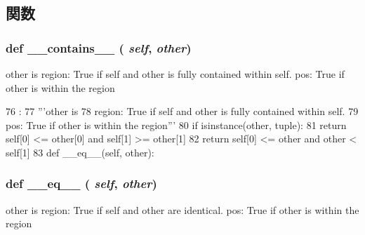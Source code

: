 \subsection{関数}
\hypertarget{classm5_1_1util_1_1region_1_1Region_a31ecdf34e79a47aea99a17eea32b7ac2}{
\subsubsection[{\_\-\_\-contains\_\-\_\-}]{\setlength{\rightskip}{0pt plus 5cm}def \_\-\_\-contains\_\-\_\- ( {\em self}, \/   {\em other})}}
\label{classm5_1_1util_1_1region_1_1Region_a31ecdf34e79a47aea99a17eea32b7ac2}
\begin{DoxyVerb}other is
region: True if self and other is fully contained within self.
pos: True if other is within the region\end{DoxyVerb}
 


\begin{DoxyCode}
76                                  :
77         '''other is
78         region: True if self and other is fully contained within self.
79         pos: True if other is within the region'''
80         if isinstance(other, tuple):
81             return self[0] <= other[0] and self[1] >= other[1]
82         return self[0] <= other and other < self[1]
83 
    def __eq__(self, other):
\end{DoxyCode}
\hypertarget{classm5_1_1util_1_1region_1_1Region_a449f8fd74d358c0ad641b6c6d6917ba0}{
\subsubsection[{\_\-\_\-eq\_\-\_\-}]{\setlength{\rightskip}{0pt plus 5cm}def \_\-\_\-eq\_\-\_\- ( {\em self}, \/   {\em other})}}
\label{classm5_1_1util_1_1region_1_1Region_a449f8fd74d358c0ad641b6c6d6917ba0}
\begin{DoxyVerb}other is
region: True if self and other are identical.
pos: True if other is within the region\end{DoxyVerb}
 


